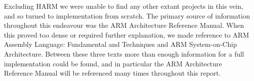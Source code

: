 Excluding HARM we were unable to find any other extant projects in this vein, and so turned to implementation from scratch. The primary source of information throughout this endeavour was the ARM Architecture Reference Manual\citep{armarm:2005}. When this proved too dense or required further explanation, we made reference to ARM Assembly Language: Fundamental and Techniques\citep{hohl:2009} and ARM System-on-Chip Architecture\citep{furber2000arm}. Between these three texts more than enough information for a full implementation could be found, and in particular the ARM Architecture Reference Manual\citep{armarm:2005} will be referenced many times throughout this report.
